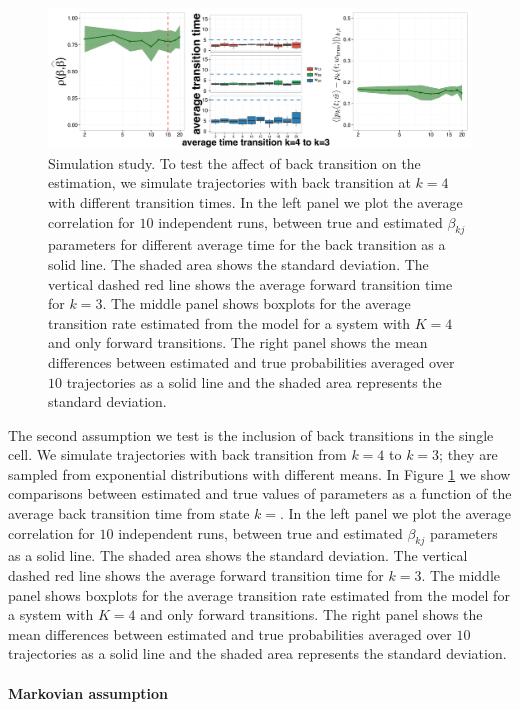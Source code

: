 \begin{figure}
  \centering \includegraphics[width=1\textwidth]{pics/back-trans.pdf}
  \caption{Simulation study. To test the affect of back transition on the estimation, we simulate trajectories with back transition at $k=4$ with different transition times. In the left panel we plot the average correlation for $10$ independent runs, between true and estimated $\beta_{kj}$ parameters for different average time for the back transition as a solid line. The shaded area shows the standard deviation. The vertical dashed red line shows the average forward transition time for $k=3$. The middle panel shows boxplots for the average transition rate estimated from the model for a system with $K=4$ and only forward transitions. The right panel shows the mean differences between estimated and true probabilities averaged over $10$ trajectories as a solid line and the shaded area represents the standard deviation.}
    \label{fig:back}
\end{figure}


The second assumption we test is the inclusion of back transitions in the single cell. We simulate trajectories with back transition from $k=4$ to $k=3$; they are sampled from exponential distributions with different means. In Figure \ref{fig:back} we show comparisons between estimated and true values of parameters as a function of the average back transition time from state $k=$. In the left panel we plot the average correlation for $10$ independent runs, between true and estimated $\beta_{kj}$ parameters as a solid line. The shaded area shows the standard deviation. The vertical dashed red line shows the average forward transition time for $k=3$. The middle panel shows boxplots for the average transition rate estimated from the model for a system with $K=4$ and only forward transitions. The right panel shows the mean differences between estimated and true probabilities averaged over $10$ trajectories as a solid line and the shaded area represents the standard deviation.

\paragraph{Markovian assumption}
\label{sec:stud-t-distr}


